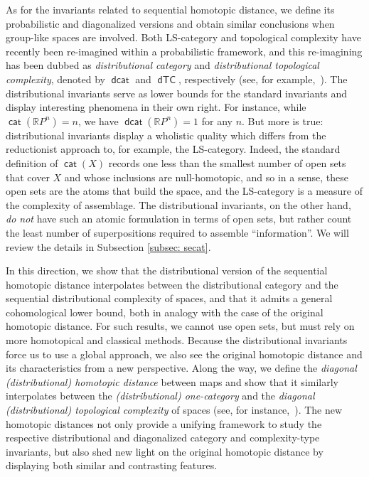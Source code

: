 \documentclass[amscd,amssymb,verbatim,10pt]{amsart}
\numberwithin{equation}{section}
\theoremstyle{plain}
\theoremstyle{definition}
\DeclareMathOperator{\cat}{{\mathsf{cat}}}
\DeclareMathOperator{\dcat}{{\mathsf{dcat}}}
\DeclareMathOperator{\dTC}{{\mathsf{dTC}}}
\def\R{{\mathbb R}}
\begin{document}
As for the invariants related to sequential homotopic distance, we define its probabilistic and diagonalized versions and obtain similar conclusions when group-like spaces are involved. Both LS-category and topological complexity have recently been re-imagined within a probabilistic framework, and this re-imagining has been dubbed as \emph{distributional category} and \emph{distributional topological complexity}, denoted by $\dcat$ and $\dTC$, respectively (see, for example,~\cite{DJ,KW}). The distributional invariants serve as lower bounds for the standard invariants 
and display interesting phenomena in their own right. For instance, while 
$\cat(\R P^n) = n$, we have $\dcat(\R P^n)=1$ for any $n$. But more is true: distributional invariants display a wholistic quality which differs from the 
reductionist approach to, for example, the LS-category. Indeed, the standard definition of $\cat(X)$ records one less than the smallest number of open sets 
that cover $X$ and whose inclusions are null-homotopic, and so in a sense, these open 
sets are the atoms that build the space, and the LS-category is a measure of the complexity
of assemblage. The distributional invariants, on the other hand, \emph{do not} have such an atomic formulation in terms of open sets, but rather count the least number of 
superpositions required to assemble ``information''. We will review the details in
Subsection \ref{subsec: secat}. 

In this direction, we show that the distributional version of the sequential homotopic distance interpolates between the distributional category and the sequential distributional complexity of spaces, and that it admits a general cohomological lower bound, both in analogy with the case of the original homotopic distance. For such results, we cannot use open sets, but must rely on more homotopical and classical methods. Because the distributional invariants force us to use a global approach, we also see the original homotopic distance and its characteristics from a new perspective. Along the way, we define the \emph{diagonal (distributional) homotopic distance} between maps and show that it similarly interpolates between the \emph{(distributional) one-category} and the \emph{diagonal (distributional) topological complexity} of spaces (see, for instance,~\cite{FGLO1,JO}). The new homotopic distances not only provide a unifying framework to study the respective distributional and diagonalized category and complexity-type invariants, but also shed new light on the original homotopic distance by displaying both similar and contrasting features.
\end{document}
